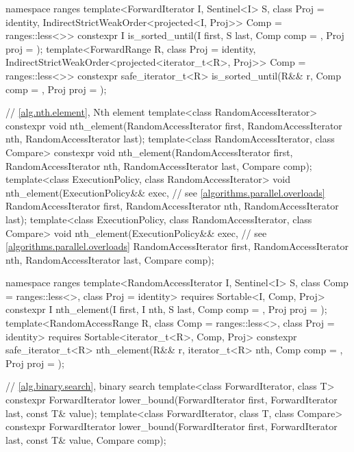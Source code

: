 \begin{codeblock}
{  namespace ranges {
    template<ForwardIterator I, Sentinel<I> S, class Proj = identity,
             IndirectStrictWeakOrder<projected<I, Proj>> Comp = ranges::less<>>
      constexpr I is_sorted_until(I first, S last, Comp comp = {}, Proj proj = {});
    template<ForwardRange R, class Proj = identity,
             IndirectStrictWeakOrder<projected<iterator_t<R>, Proj>> Comp = ranges::less<>>
      constexpr safe_iterator_t<R>
        is_sorted_until(R&& r, Comp comp = {}, Proj proj = {});
  }

  // \ref{alg.nth.element}, Nth element
  template<class RandomAccessIterator>
    constexpr void nth_element(RandomAccessIterator first, RandomAccessIterator nth,
                               RandomAccessIterator last);
  template<class RandomAccessIterator, class Compare>
    constexpr void nth_element(RandomAccessIterator first, RandomAccessIterator nth,
                               RandomAccessIterator last, Compare comp);
  template<class ExecutionPolicy, class RandomAccessIterator>
    void nth_element(ExecutionPolicy&& exec, // see \ref{algorithms.parallel.overloads}
                     RandomAccessIterator first, RandomAccessIterator nth,
                     RandomAccessIterator last);
  template<class ExecutionPolicy, class RandomAccessIterator, class Compare>
    void nth_element(ExecutionPolicy&& exec, // see \ref{algorithms.parallel.overloads}
                     RandomAccessIterator first, RandomAccessIterator nth,
                     RandomAccessIterator last, Compare comp);

  namespace ranges {
    template<RandomAccessIterator I, Sentinel<I> S, class Comp = ranges::less<>,
             class Proj = identity>
      requires Sortable<I, Comp, Proj>
      constexpr I
        nth_element(I first, I nth, S last, Comp comp = {}, Proj proj = {});
    template<RandomAccessRange R, class Comp = ranges::less<>, class Proj = identity>
      requires Sortable<iterator_t<R>, Comp, Proj>
      constexpr safe_iterator_t<R>
        nth_element(R&& r, iterator_t<R> nth, Comp comp = {}, Proj proj = {});
  }

  // \ref{alg.binary.search}, binary search
  template<class ForwardIterator, class T>
    constexpr ForwardIterator
      lower_bound(ForwardIterator first, ForwardIterator last,
                  const T& value);
  template<class ForwardIterator, class T, class Compare>
    constexpr ForwardIterator
      lower_bound(ForwardIterator first, ForwardIterator last,
                  const T& value, Compare comp);

}
\end{codeblock}
